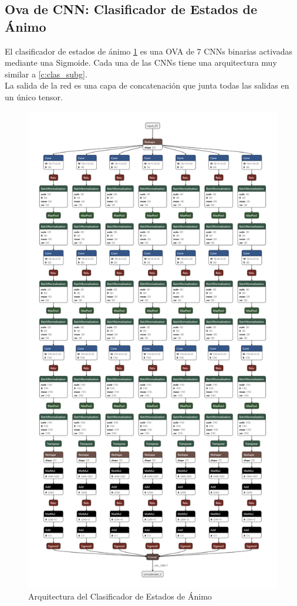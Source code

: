 \subsection{Ova de CNN: Clasificador de Estados de Ánimo}

El clasificador de estados de ánimo \ref{fig:C:ova} es una OVA de 7 CNNs binarias activadas mediante una Sigmoide. Cada una de las CNNs tiene una arquitectura muy similar a \ref{c:clas_subg}.\\
La salida de la red es una capa de concatenación que junta todas las salidas en un único tensor.

\begin{figure}
    \centering
    \includegraphics[width=\textwidth,height=\textheight,keepaspectratio]{img/C/cnn_moods_ova.png}
    \caption{Arquitectura del Clasificador de Estados de Ánimo}
    \label{fig:C:ova}
\end{figure}

